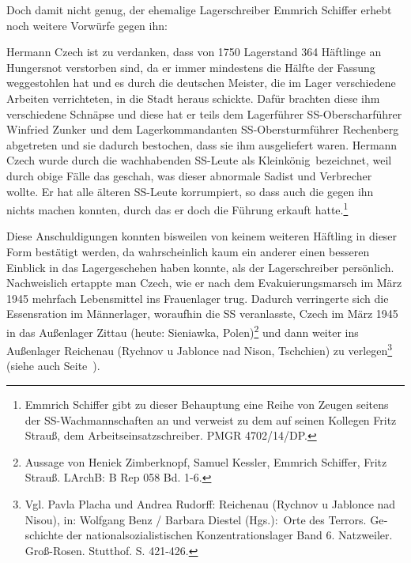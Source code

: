 \documentclass[a4paper,12pt,ngerman,
]{nisebook}
\begin{document}
Doch damit nicht genug, der ehemalige Lagerschreiber Emmrich Schiffer erhebt noch weitere Vorwürfe gegen ihn:
\begin{leftbar}
Hermann Czech ist zu verdanken, dass von 1750 Lagerstand 364 Häftlinge an Hungersnot verstorben sind, da er immer mindestens die Hälfte der Fassung weggestohlen hat und es durch die deutschen Meister, die im Lager verschiedene Arbeiten verrichteten, in die Stadt heraus schickte. Dafür brachten diese ihm verschiedene Schnäpse und diese hat er teils dem Lagerführer SS-Oberscharführer Winfried Zunker und dem Lagerkommandanten SS-Obersturmführer Rechenberg abgetreten und sie dadurch bestochen, dass sie ihm ausgeliefert waren. Hermann Czech wurde durch die wachhabenden SS-Leute als \glqq Kleinkönig\grqq~bezeichnet, weil durch obige Fälle das geschah, was dieser abnormale Sadist und Verbrecher wollte. Er hat alle älteren SS-Leute korrumpiert, so dass auch die gegen ihn nichts machen konnten, durch das er doch die Führung erkauft hatte.\footnote{Emmrich Schiffer gibt zu dieser Behauptung eine Reihe von Zeugen seitens der SS-Wachmannschaften an und verweist zu dem auf seinen Kollegen Fritz Strauß, dem Arbeitseinsatzschreiber. PMGR 4702/14/DP.}
\end{leftbar}
Diese Anschuldigungen konnten bisweilen von keinem weiteren Häftling in dieser Form bestätigt werden, da wahrscheinlich kaum ein anderer einen besseren Einblick in das Lagergeschehen haben konnte, als der Lagerschreiber persönlich. Nachweislich ertappte man Czech, wie er nach dem Evakuierungsmarsch im März 1945 mehrfach Lebensmittel ins Frauenlager trug. Dadurch verringerte sich die Essensration im Männerlager, woraufhin die SS veranlasste, Czech im März 1945 in das Außenlager Zittau (heute: Sieniawka, Polen)\footnote{Aussage von Heniek Zimberknopf, Samuel Kessler, Emmrich Schiffer, Fritz Strauß. LArchB: B Rep 058 Bd. 1-6.} und dann weiter ins Außenlager Reichenau (Rychnov u Jablonce nad Nison, Tschchien) zu verlegen\footnote{Vgl. Pavla Placha und Andrea Rudorff: Reichenau (Rychnov u Jablonce nad Nisou), in: Wolf­gang Benz / Bar­bara Die­s­tel (Hgs.): Orte des Ter­rors. Ge­schichte der na­tional­so­zia­lis­ti­schen Kon­zen­tra­ti­ons­la­ger Band 6. Natz­wei­ler. Groß-Rosen. Stutt­hof. S. 421-426.} (siehe auch Seite~\pageref{czech_ahndung}).
\end{document}
